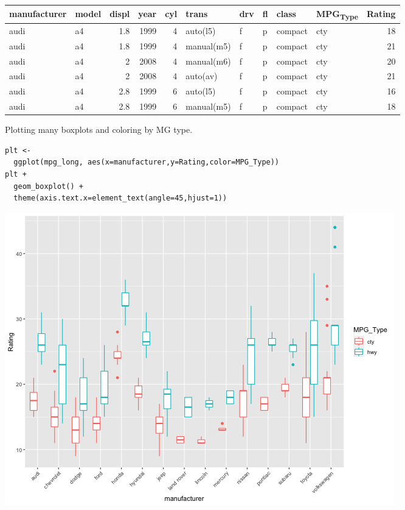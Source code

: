 \documentclass[11pt]{article}
\begin{document}
\begin{org}
\begin{center}
\begin{tabular}{llrrrlllllr}
manufacturer & model & displ & year & cyl & trans & drv & fl & class & MPG\textsubscript{Type} & Rating\\
\hline
audi & a4 & 1.8 & 1999 & 4 & auto(l5) & f & p & compact & cty & 18\\
audi & a4 & 1.8 & 1999 & 4 & manual(m5) & f & p & compact & cty & 21\\
audi & a4 & 2 & 2008 & 4 & manual(m6) & f & p & compact & cty & 20\\
audi & a4 & 2 & 2008 & 4 & auto(av) & f & p & compact & cty & 21\\
audi & a4 & 2.8 & 1999 & 6 & auto(l5) & f & p & compact & cty & 16\\
audi & a4 & 2.8 & 1999 & 6 & manual(m5) & f & p & compact & cty & 18\\
\end{tabular}
\end{center}
\end{org}

Plotting many boxplots and coloring by MG type.
\begin{verbatim}
plt <-
  ggplot(mpg_long, aes(x=manufacturer,y=Rating,color=MPG_Type))
plt +
  geom_boxplot() +
  theme(axis.text.x=element_text(angle=45,hjust=1))
\end{verbatim}

\begin{org}
\begin{center}
\includegraphics[width=.9\linewidth]{./resources/mpg_faceting.png}
\end{center}
\end{org}
\end{document}
